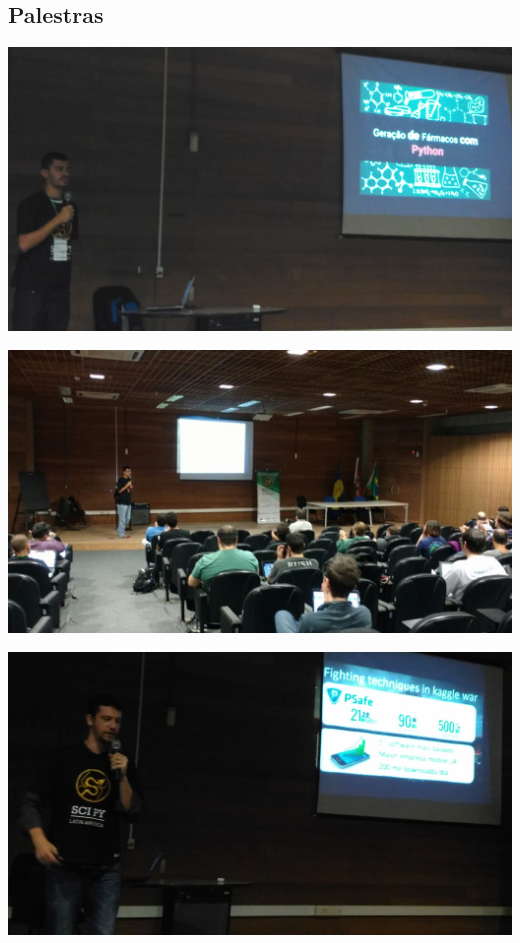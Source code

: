 \documentclass[12pt]{article}
\begin{document}
\subsection*{Palestras}

\noindent  %
\includegraphics[width=\textwidth]{talks-drugs.jpg}

\noindent  %
\includegraphics[width=\textwidth]{talks-full.jpg}

\noindent  %
\includegraphics[width=\textwidth]{talks-kaggle.jpg}
\end{document}
